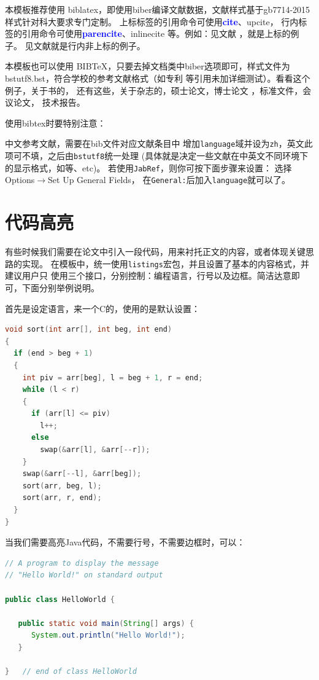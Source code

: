 本模板推荐使用 biblatex，即使用biber编译文献数据，文献样式基于gb7714-2015样式针对科大要求专门定制。
上标标签的引用命令可使用\textcolor{blue}{\textbf{cite}}、upcite，
行内标签的引用命令可使用\textcolor{blue}{\textbf{parencite}}、inlinecite 等。例如：见文献
\cite{ref-1-1-周融,ref-2-2-夏鲁惠,ref-3-3-Heider,ref-4-3-刘国钧,ref-5-5-Gill}，就是上标的例子。
见文献\parencite{ref-6-6-李大伦,ref-7-7-French,ref-8-8-伍蠡甫,ref-9-9-Spivak,ref-10-10-Almarza}就是行内非上标的例子。

本模板也可以使用 BIB\TeX，只要去掉文档类中biber选项即可，样式文件为 bstutf8.bst，符合学校的参考文献格式（如专利
等引用未加详细测试）。看看这个例子，关于书的，
还有这些，关于杂志的，硕士论文，博士论文
，标准文件，会议论文，%
技术报告。

使用bibtex时要特别注意：

中文参考文献，需要在bib文件对应文献条目中
增加\verb|language|域并设为\verb|zh|，英文此项可不填，之后由\verb|bstutf8|统一处理
(具体就是决定一些文献在中英文不同环境下的显示格式，如等、etc)。
若使用\verb|JabRef|，则你可按下面步骤来设置：
选择\textsf{Options}$\rightarrow$\textsf{Set Up General Fields}，
在\verb|General:|后加入\verb|language|就可以了。



\section{代码高亮}
有些时候我们需要在论文中引入一段代码，用来衬托正文的内容，或者体现关键思路的实现。
在模板中，统一使用\texttt{listings}宏包，并且设置了基本的内容格式，并建议用户只
使用三个接口，分别控制：编程语言，行号以及边框。简洁达意即可，下面分别举例说明。

首先是设定语言，来一个C的，使用的是默认设置：
\begin{lstlisting}[language=C]
void sort(int arr[], int beg, int end)
{
  if (end > beg + 1)
  {
    int piv = arr[beg], l = beg + 1, r = end;
    while (l < r)
    {
      if (arr[l] <= piv)
        l++;
      else
        swap(&arr[l], &arr[--r]);
    }
    swap(&arr[--l], &arr[beg]);
    sort(arr, beg, l);
    sort(arr, r, end);
  }
}
\end{lstlisting}

当我们需要高亮Java代码，不需要行号，不需要边框时，可以：
\begin{lstlisting}[language=Java,numbers=none,frame=none]
// A program to display the message
// "Hello World!" on standard output

public class HelloWorld {

   public static void main(String[] args) {
      System.out.println("Hello World!");
   }

}   // end of class HelloWorld
\end{lstlisting}

